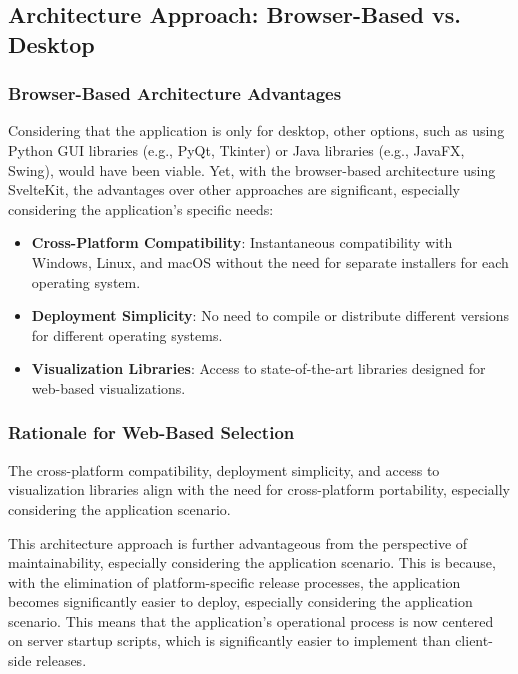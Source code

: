 \vspace{\baselineskip}

\subsection{Architecture Approach: Browser-Based vs. Desktop}

\subsubsection{Browser-Based Architecture Advantages}
Considering that the application is only for desktop, other options, such as using Python GUI libraries (e.g., PyQt, Tkinter) or Java libraries (e.g., JavaFX, Swing), would have been viable. Yet, with the browser-based architecture using SvelteKit, the advantages over other approaches are significant, especially considering the application's specific needs:
\begin{itemize}
	\item \textbf{Cross-Platform Compatibility}: Instantaneous compatibility with Windows, Linux, and macOS without the need for separate installers for each operating system.
	\item \textbf{Deployment Simplicity}: No need to compile or distribute different versions for different operating systems.
	\item \textbf{Visualization Libraries}: Access to state-of-the-art libraries designed for web-based visualizations.
\end{itemize}

\subsubsection{Rationale for Web-Based Selection}
The cross-platform compatibility, deployment simplicity, and access to visualization libraries align with the need for cross-platform portability, especially considering the application scenario.

This architecture approach is further advantageous from the perspective of maintainability, especially considering the application scenario. This is because, with the elimination of platform-specific release processes, the application becomes significantly easier to deploy, especially considering the application scenario. This means that the application's operational process is now centered on server startup scripts, which is significantly easier to implement than client-side releases.

